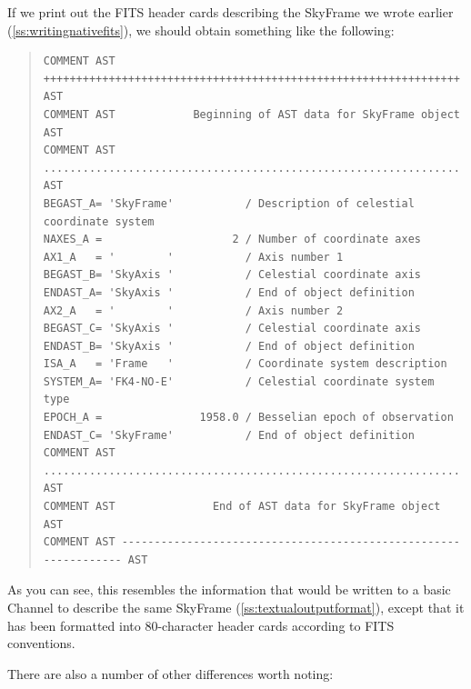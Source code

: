 \documentclass[twoside,11pt]{article}
\newcommand{\htmlref}[2]{#1}
\newcommand{\secref}[1]{\S\ref{#1}}
\renewcommand{\secref}[1]{\ref{#1}}
\begin{document}
If we print out the FITS header cards describing the \htmlref{SkyFrame}{SkyFrame} we wrote
earlier (\secref{ss:writingnativefits}), we should obtain something
like the following:

\begin{quote}
\small
\begin{verbatim}
COMMENT AST ++++++++++++++++++++++++++++++++++++++++++++++++++++++++++++++++ AST
COMMENT AST            Beginning of AST data for SkyFrame object             AST
COMMENT AST ................................................................ AST
BEGAST_A= 'SkyFrame'           / Description of celestial coordinate system     
NAXES_A =                    2 / Number of coordinate axes                      
AX1_A   = '        '           / Axis number 1                                  
BEGAST_B= 'SkyAxis '           / Celestial coordinate axis                      
ENDAST_A= 'SkyAxis '           / End of object definition                       
AX2_A   = '        '           / Axis number 2                                  
BEGAST_C= 'SkyAxis '           / Celestial coordinate axis                      
ENDAST_B= 'SkyAxis '           / End of object definition                       
ISA_A   = 'Frame   '           / Coordinate system description                  
SYSTEM_A= 'FK4-NO-E'           / Celestial coordinate system type               
EPOCH_A =               1958.0 / Besselian epoch of observation                 
ENDAST_C= 'SkyFrame'           / End of object definition                       
COMMENT AST ................................................................ AST
COMMENT AST               End of AST data for SkyFrame object                AST
COMMENT AST ---------------------------------------------------------------- AST
\end{verbatim}
\normalsize
\end{quote}

As you can see, this resembles the information that would be written
to a basic \htmlref{Channel}{Channel} to describe the same SkyFrame
(\secref{ss:textualoutputformat}), except that it has been formatted
into 80-character header cards according to FITS conventions.

There are also a number of other differences worth noting:
\end{document}
